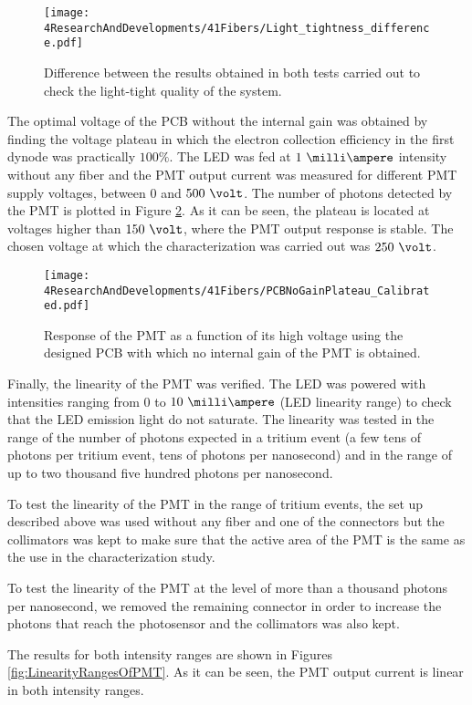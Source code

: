 \begin{figure}[h]
\centering
\texttt{[image: 4ResearchAndDevelopments/41Fibers/Light\_tightness\_difference.pdf]}
\caption{Difference between the results obtained in both tests carried out to check the light-tight quality of the system.\label{fig:LightTightnessTest}}
\end{figure}

The optimal voltage of the PCB without the internal gain was obtained by finding the voltage plateau in which the electron collection efficiency in the first dynode was practically $100\%$. The LED was fed at $1~\milli\ampere$ intensity without any fiber and the PMT output current was measured for different PMT supply voltages, between $0$ and $500~\volt$. The number of photons detected by the PMT is plotted in Figure \ref{fig:PlateauNoGainPMT}. As it can be seen, the plateau is located at voltages higher than $150~\volt$, where the PMT output response is stable. The chosen voltage at which the characterization was carried out was $250~\volt$.


\begin{figure}[h]
\centering
\texttt{[image: 4ResearchAndDevelopments/41Fibers/PCBNoGainPlateau\_Calibrated.pdf]}
\caption{Response of the PMT as a function of its high voltage using the designed PCB with which no internal gain of the PMT is obtained.\label{fig:PlateauNoGainPMT}}
\end{figure}

Finally, the linearity of the PMT was verified. The LED was powered with intensities ranging from 0 to $10~\milli\ampere$ (LED linearity range) to check that the LED emission light do not saturate. The linearity was tested in the range of the number of photons expected in a tritium event (a few tens of photons per tritium event, tens of photons per nanosecond) and in the range of up to two thousand five hundred photons per nanosecond.

To test the linearity of the PMT in the range of tritium events, the set up described above was used without any fiber and one of the connectors but the collimators was kept to make sure that the active area of the PMT is the same as the use in the characterization study.

To test the linearity of the PMT at the level of more than a thousand photons per nanosecond, we removed the remaining connector in order to increase the photons that reach the photosensor and the collimators was also kept.

The results for both intensity ranges are shown in Figures \ref{fig:LinearityRangesOfPMT}. As it can be seen, the PMT output current is linear in both intensity ranges.

